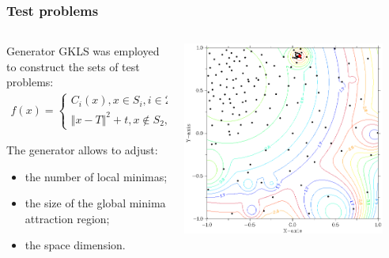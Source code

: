 \documentclass[aspectratio=1610]{beamer}
\begin{document}
\begin{frame}
  \frametitle{Test problems}
  \begin{columns}
    \begin{column}{0.5\textwidth}
      Generator GKLS was employed to construct the sets of test problems:
      \begin{displaymath}
        \begin{matrix}
          f(x)=
          \left\{
          \begin{matrix}
          C_i(x), x \in S_i, i\in 2,\dots ,m \\
          \Vert x-T \Vert^2 + t, x\not\in S_2,\dots,S_m
          \end{matrix} \right.
        \end{matrix}
      \end{displaymath}

      The generator allows to adjust:
      \begin{itemize}
        \item the number of local minimas;
        \item the size of the global minima attraction region;
        \item the space dimension.
      \end{itemize}
    \end{column}
    \begin{column}{0.5\textwidth}
      \centerline{\includegraphics[width=0.9\textwidth]{gkls_color.png}}
    \end{column}
  \end{columns}
\end{frame}
\end{document}
